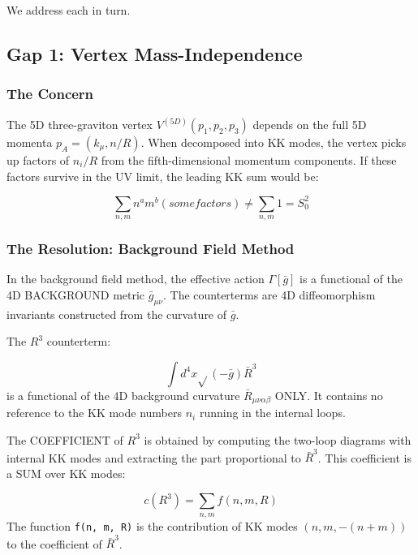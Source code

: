 \documentclass[aps,prd,preprint,superscriptaddress,longbibliography,floatfix]{revtex4-2}
\theoremstyle{remark}
\begin{document}
We address each in turn.



\subsection{Gap 1: Vertex Mass-Independence}


\subsubsection{The Concern}

The 5D three-graviton vertex $V^{(5D)}(p_{1}, p_{2}, p_{3})$ depends on the full 5D momenta $p_A = (k_\mu, n/R)$. When decomposed into KK modes, the vertex picks up factors of $n_i/R$ from the fifth-dimensional momentum components. If these factors survive in the UV limit, the leading KK sum would be:


\begin{equation}
    \sum_{n,m} n^a m^b (some factors) \neq \sum_{n,m} 1 = S_{0}^{2}
\end{equation}

\subsubsection{The Resolution: Background Field Method}

In the background field method, the effective action $\Gamma[\bar{g}]$ is a functional of the 4D BACKGROUND metric $\bar{g}_{\mu\nu}$. The counterterms are 4D diffeomorphism invariants constructed from the curvature of $\bar{g}$.

The $R^{3}$ counterterm:


\begin{equation}
    \int d^{4}x \sqrt{}(-\bar{g}) \bar{R}^{3}
\end{equation}
is a functional of the 4D background curvature $\bar{R}_{\mu\nu\alpha\beta}$ ONLY. It contains no reference to the KK mode numbers $n_i$ running in the internal loops.

The COEFFICIENT of $R^{3}$ is obtained by computing the two-loop diagrams with internal KK modes and extracting the part proportional to $\bar{R}^{3}$. This coefficient is a SUM over KK modes:


\begin{equation}
    c(R^{3}) = \sum_{n,m} f(n, m, R)
\end{equation}
The function \texttt{f(n, m, R)} is the contribution of KK modes $(n, m, -(n+m))$ to the coefficient of $\bar{R}^{3}$.
\end{document}
